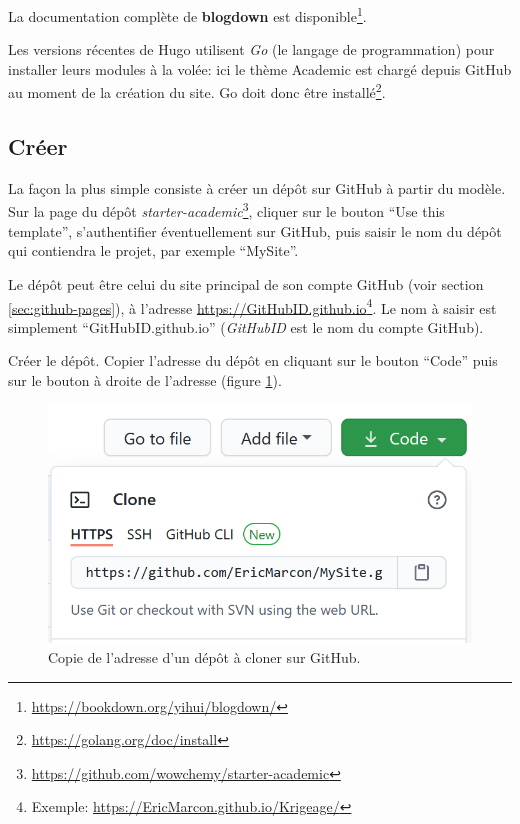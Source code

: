 \documentclass[
  12pt,
  french,
  a4paper,
  extrafontsizes,onecolumn,openright
  ]{memoir}
\begin{document}
La documentation complète de \textbf{blogdown} est disponible\footnote{\url{https://bookdown.org/yihui/blogdown/}}.

Les versions récentes de Hugo utilisent \emph{Go} (le langage de programmation) pour installer leurs modules à la volée: ici le thème Academic est chargé depuis GitHub au moment de la création du site.
Go doit donc être installé\footnote{\url{https://golang.org/doc/install}}.

\subsection{Créer}\label{cruxe9er-2}

La façon la plus simple consiste à créer un dépôt sur GitHub à partir du modèle.
Sur la page du dépôt \emph{starter-academic}\footnote{\url{https://github.com/wowchemy/starter-academic}}, cliquer sur le bouton \enquote{Use this template}, s'authentifier éventuellement sur GitHub, puis saisir le nom du dépôt qui contiendra le projet, par exemple \enquote{MySite}.

Le dépôt peut être celui du site principal de son compte GitHub (voir section \ref{sec:github-pages}), à l'adresse \url{https://GitHubID.github.io}\footnote{Exemple: \url{https://EricMarcon.github.io/Krigeage/}}.
Le nom à saisir est simplement \enquote{GitHubID.github.io} (\emph{GitHubID} est le nom du compte GitHub).

Créer le dépôt.
Copier l'adresse du dépôt en cliquant sur le bouton \enquote{Code} puis sur le bouton à droite de l'adresse (figure \ref{fig:rediger-GitHub-Clone}).



\scriptsize

\begin{figure}

{\centering \includegraphics[width=0.8\linewidth]{images/rediger-GitHub-Clone} 

}

\caption{Copie de l'adresse d'un dépôt à cloner sur GitHub.}\label{fig:rediger-GitHub-Clone}
\end{figure}
\end{document}
